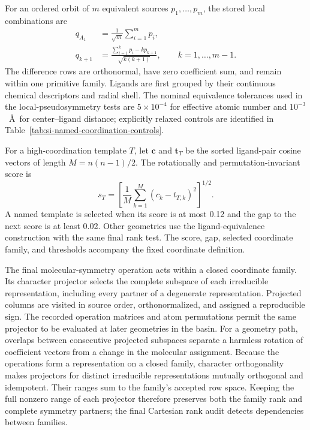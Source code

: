 \documentclass[10pt]{article}
\begin{document}
{For an ordered orbit of \(m\) equivalent sources
\(p_1,\ldots,p_m\), the stored local combinations are}
{
\begin{align}
 q_{A_1}&=\frac{1}{\sqrt m}\sum_{i=1}^{m}p_i,\\
 q_{k+1}&=\frac{\sum_{i=1}^{k}p_i-kp_{k+1}}{\sqrt{k(k+1)}},
 \qquad k=1,\ldots,m-1.
 \label{eq:si-local-combinations}
\end{align}
}
{The difference rows are orthonormal, have zero coefficient
sum, and remain within one primitive family. Ligands are first grouped by
their continuous chemical descriptors and radial shell. The nominal
equivalence tolerances used in the local-pseudosymmetry tests are
\(5\times10^{-4}\) for effective atomic number and \(10^{-3}\)~\AA\ for
center--ligand distance; explicitly relaxed controls are identified in
Table~\ref{tab:si-named-coordination-controls}.}

{For a high-coordination template \(T\), let \(\mathbf c\)
and \(\mathbf t_T\) be the sorted ligand-pair cosine vectors of length
\(M=n(n-1)/2\). The rotationally and permutation-invariant score is}
\begin{equation}
 {s_T=\left[\frac{1}{M}\sum_{k=1}^{M}
 (c_k-t_{T,k})^2\right]^{1/2}.}
 \label{eq:si-template-score}
\end{equation}
{A named template is selected when its score is at most 0.12
and the gap to the next score is at least 0.02. Other geometries use the
ligand-equivalence construction with the same final rank test. The score,
gap, selected coordinate family, and thresholds accompany the fixed
coordinate definition.}

{The final molecular-symmetry operation acts within a closed
coordinate family. Its character projector selects the complete subspace of
each irreducible representation, including every partner of a degenerate
representation. Projected columns are visited in source order, orthonormalized,
and assigned a reproducible sign. The recorded operation matrices and atom
permutations permit the same projector to be evaluated at later geometries
in the basin. For a geometry path, overlaps between consecutive projected
subspaces separate a harmless rotation of coefficient vectors from a change
in the molecular assignment.}
{Because the operations form a representation on a closed
family, character orthogonality makes projectors for distinct irreducible
representations mutually orthogonal and idempotent. Their ranges sum to the
family's accepted row space. Keeping the full nonzero range of each projector
therefore preserves both the family rank and complete symmetry partners;
the final Cartesian rank audit detects dependencies between families.}
\end{document}
